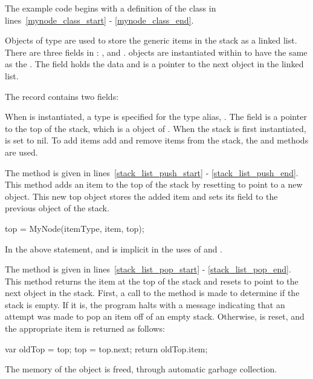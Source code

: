The example code begins with a definition of the  class in 
lines~\ref{mynode_class_start} - \ref{mynode_class_end}.  
\begin{chapel}
class MyNode {                      
  type itemType;                   
  var item: itemType;             
  var next: MyNode(itemType);    
\end{chapel}
Objects of type  are used to store the generic items in the stack
as a linked list.  There are three fields in :  , 
 and
.   objects are instantiated within  to
have the same  as the .  The  field
holds the data and  is a pointer to the next  object
in the linked list.

The  record contains two fields:
\begin{chapel}
record Stack {                      
  type itemType;                   
  var top: MyNode(itemType);      
\end{chapel}
When  is instantiated, a type is specified for the type
alias, .  The  field is a pointer to the top
of the stack, which is a  object of .  When
the stack is first instantiated,  is set to nil.  To add items
add and remove items from the stack, the  and  
methods are used.

The  method is given in lines~\ref{stack_list_push_start} -
\ref{stack_list_push_end}.  This method adds an item to the top of the stack
by resetting  to point to a new  object.  This new
top object stores the added item and sets its  field to the previous
 object of the stack.
\begin{chapel}
    top = MyNode(itemType, item, top); 
\end{chapel}
In the above statement,  and  is
implicit in the uses of  and .

The  method is given in lines~\ref{stack_list_pop_start} -
\ref{stack_list_pop_end}.  This method returns the item at the top of
the stack and resets  to point to the next object in the stack.
First, a call to the  method  is made to 
determine if the stack is
empty.  If it is, the program halts with a message indicating that 
an attempt was made to pop an item off of an empty stack.  Otherwise,
 is reset, and the appropriate item is returned as follows:
\begin{chapel}
    var oldTop = top;              
    top = top.next;               
    return oldTop.item;          
\end{chapel}
The memory of the  object is freed, through automatic
garbage collection.

